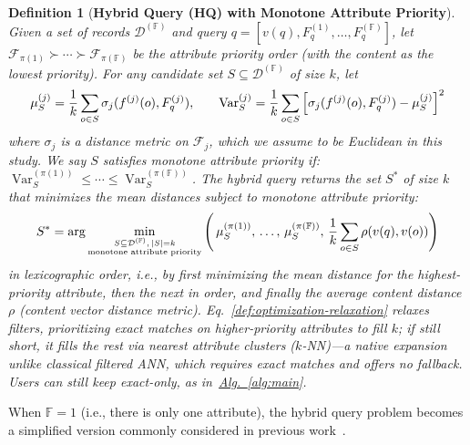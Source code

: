 \documentclass[numbers,sort]{article}
\newtheorem{definition}{Definition}
\begin{document}
\begin{definition}[\textbf{Hybrid Query (HQ) with Monotone Attribute Priority}]
Given a set of records $\mathcal{D}^{(\mathbb{F})}$ and query $q = [v(q), F^{(1)}_q, \dots, F^{(\mathbb{F})}_q]$, let $\mathcal{F}_{\pi(1)} \succ \cdots \succ \mathcal{F}_{\pi(\mathbb{F})}$ be the attribute priority order (with the content as the lowest priority). For any candidate set $S \subseteq \mathcal{D}^{(\mathbb{F})}$ of size $k$, let
\begin{equation}
\small
    \mu_S^{(j)} = \frac{1}{k} \sum_{o \in S} \sigma_j(f^{(j)}(o), F^{(j)}_q), \qquad
\operatorname{Var}_S^{(j)} = \frac{1}{k} \sum_{o \in S} \left[ \sigma_j(f^{(j)}(o), F^{(j)}_q) - \mu_S^{(j)} \right]^2
\label{eq:variance}
\end{equation} where $\sigma_j$ is a distance metric on $\mathcal{F}_j$, which we assume to be Euclidean in this study. We say $S$ satisfies \emph{monotone attribute priority} if:~$\operatorname{Var}_S^{(\pi(1))} \leq \cdots \leq \operatorname{Var}_S^{(\pi(\mathbb{F}))}$. The hybrid query returns the set $S^*$ of size $k$ that minimizes the mean distances subject to monotone attribute priority:
\begin{equation}
\small
    S^* = \arg\min_{\substack{S \subseteq \mathcal{D}^{(\mathbb{F})},\, |S|=k \\ \text{monotone attribute priority}}}
\left( \, \mu_S^{(\pi(1))},\, \ldots,\, \mu_S^{(\pi(\mathbb{F}))},\, \frac{1}{k} \sum_{o \in S} \rho(v(q), v(o)) \right)
\label{def:optimization-relaxation}
\end{equation}
in lexicographic order, i.e., by first minimizing the mean distance for the highest-priority attribute, then the next in order, and finally the average content distance $\rho$ (content vector distance metric). Eq.~\ref{def:optimization-relaxation} relaxes filters, prioritizing exact matches on higher-priority attributes to fill \(k\); if still short, it fills the rest via nearest attribute clusters ($k$-NN)—a native expansion unlike classical filtered ANN, which requires exact matches and offers no fallback. Users can still keep exact-only, as in~\hyperref[alg:main]{Alg.~\ref*{alg:main}}.
\label{def:hq-multi}
\end{definition}


When $\mathbb{F}=1$ (i.e., there is only one attribute), the hybrid query problem becomes a simplified version commonly considered in previous work~\cite{chen2021spann,gollapudi2023filtered,vearch,tan2023nhq,wang2021milvus,hqann,fcvi,xu2025iranggraph,zhu2020adbv,zuo2024serf}.
\end{document}
